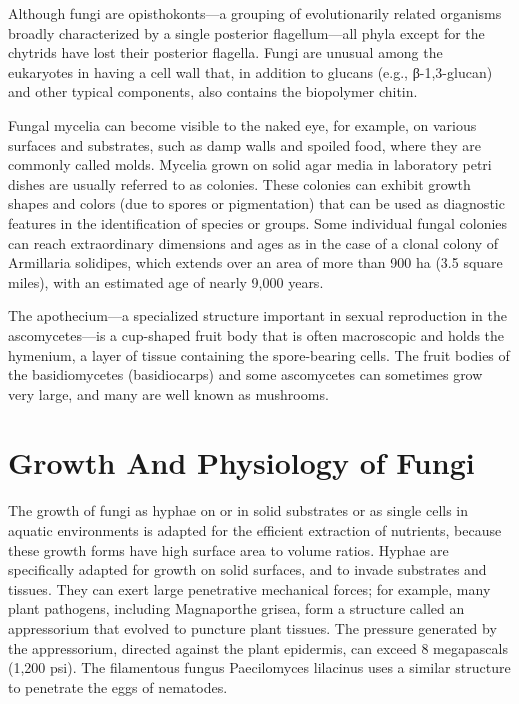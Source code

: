 Although fungi are opisthokonts---a grouping of evolutionarily related organisms broadly characterized by a single posterior flagellum---all phyla except for the chytrids have lost their posterior flagella. Fungi are unusual among the eukaryotes in having a cell wall that, in addition to glucans (e.g., β-1,3-glucan) and other typical components, also contains the biopolymer chitin.

Fungal mycelia can become visible to the naked eye, for example, on various surfaces and substrates, such as damp walls and spoiled food, where they are commonly called molds. Mycelia grown on solid agar media in laboratory petri dishes are usually referred to as colonies. These colonies can exhibit growth shapes and colors (due to spores or pigmentation) that can be used as diagnostic features in the identification of species or groups. Some individual fungal colonies can reach extraordinary dimensions and ages as in the case of a clonal colony of Armillaria solidipes, which extends over an area of more than 900 ha (3.5 square miles), with an estimated age of nearly 9,000 years.

The apothecium---a specialized structure important in sexual reproduction in the ascomycetes---is a cup-shaped fruit body that is often macroscopic and holds the hymenium, a layer of tissue containing the spore-bearing cells. The fruit bodies of the basidiomycetes (basidiocarps) and some ascomycetes can sometimes grow very large, and many are well known as mushrooms.

\hypertarget{growth-and-physiology-of-fungi}{%
\section{Growth And Physiology of Fungi}\label{growth-and-physiology-of-fungi}}

The growth of fungi as hyphae on or in solid substrates or as single cells in aquatic environments is adapted for the efficient extraction of nutrients, because these growth forms have high surface area to volume ratios. Hyphae are specifically adapted for growth on solid surfaces, and to invade substrates and tissues. They can exert large penetrative mechanical forces; for example, many plant pathogens, including Magnaporthe grisea, form a structure called an appressorium that evolved to puncture plant tissues. The pressure generated by the appressorium, directed against the plant epidermis, can exceed 8 megapascals (1,200 psi). The filamentous fungus Paecilomyces lilacinus uses a similar structure to penetrate the eggs of nematodes.

